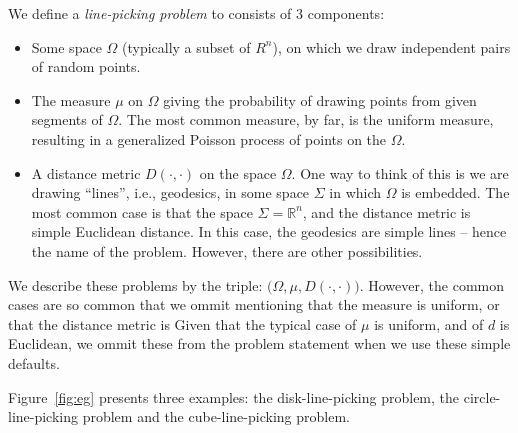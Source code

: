 \documentclass{article}
\def\R{\mathbb{R}}
\begin{document}
We define a {\em line-picking problem} to consists of 3 components:
\begin{itemize}

\item Some space $\Omega$ (typically a subset of $R^n$), on which we
  draw independent pairs of random points.

\item The measure $\mu$ on $\Omega$ giving the probability of drawing
  points from given segments of $\Omega$. The most common measure, by
  far, is the uniform measure, resulting in a generalized Poisson
  process of points on the $\Omega$.

\item A distance metric $D(\cdot, \cdot)$ on the space $\Omega$. One
  way to think of this is we are drawing ``lines'', i.e., geodesics,
  in some space $\Sigma$ in which $\Omega$ is embedded. The most
  common case is that the space $\Sigma = \R^n$, and the distance
  metric is simple Euclidean distance. In this case, the geodesics are
  simple lines -- hence the name of the problem. However, there are
  other possibilities.

\end{itemize}
We describe these problems by the triple: $\big(\Omega, \mu, D(\cdot,
\cdot)\big)$. However, the common cases are so common that we ommit
mentioning that the measure is uniform, or that the distance metric is
Given that the typical case of $\mu$ is uniform, and of $d$ is
Euclidean, we ommit these from the problem statement when we use these
simple defaults.

Figure~\ref{fig:eg} presents three examples: the disk-line-picking
problem, the circle-line-picking problem and the cube-line-picking
problem.
\end{document}
